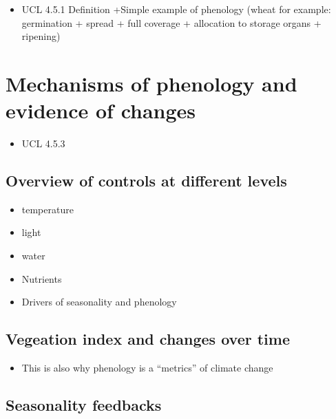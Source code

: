 \documentclass[
  oneside]{book}
\providecommand{\tightlist}{%
  \setlength{\itemsep}{0pt}\setlength{\parskip}{0pt}}
\begin{document}
\begin{itemize}
\tightlist
\item
  UCL 4.5.1
  Definition +Simple example of phenology (wheat for example: germination + spread + full coverage + allocation to storage organs + ripening)
\end{itemize}

\hypertarget{mechanisms-of-phenology-and-evidence-of-changes}{%
\section{Mechanisms of phenology and evidence of changes}\label{mechanisms-of-phenology-and-evidence-of-changes}}

\begin{itemize}
\tightlist
\item
  UCL 4.5.3
\end{itemize}

\hypertarget{overview-of-controls-at-different-levels}{%
\subsection{Overview of controls at different levels}\label{overview-of-controls-at-different-levels}}

\begin{itemize}
\tightlist
\item
  temperature
\item
  light
\item
  water
\item
  Nutrients
\item
  Drivers of seasonality and phenology
\end{itemize}

\hypertarget{vegeation-index-and-changes-over-time}{%
\subsection{Vegeation index and changes over time}\label{vegeation-index-and-changes-over-time}}

\begin{itemize}
\tightlist
\item
  This is also why phenology is a ``metrics'' of climate change
\end{itemize}

\hypertarget{seasonality-feedbacks}{%
\subsection{Seasonality feedbacks}\label{seasonality-feedbacks}}
\end{document}
